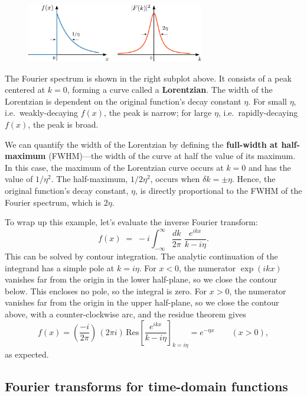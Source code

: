 \documentclass[10pt,a4paper]{article}
\begin{document}
\begin{figure}[h]
  \centering\includegraphics[width=0.69\textwidth]{fourier_example1}
\end{figure}

The Fourier spectrum is shown in the right subplot above. It consists
of a peak centered at $k = 0$, forming a curve called a
\textbf{Lorentzian}. The width of the Lorentzian is dependent on the
original function's decay constant $\eta$. For small $\eta$,
i.e.~weakly-decaying $f(x)$, the peak is narrow; for large $\eta$,
i.e.~rapidly-decaying $f(x)$, the peak is broad.

We can quantify the width of the Lorentzian by defining the
\textbf{full-width at half-maximum} (FWHM)---the width of the curve at
half the value of its maximum. In this case, the maximum of the
Lorentzian curve occurs at $k=0$ and has the value of $1/\eta^2$.  The
half-maximum, $1/2\eta^2$, occurs when $\delta k = \pm \eta$.  Hence,
the original function's decay constant, $\eta$, is directly
proportional to the FWHM of the Fourier spectrum, which is $2\eta$.

To wrap up this example, let's evaluate the inverse Fourier transform:
\begin{equation}
f(x) \; = \; -i\int_{-\infty}^\infty \frac{dk}{2\pi} \; \frac{e^{i kx}}{k-i\eta}.
\end{equation}
This can be solved by contour integration. The analytic continuation
of the integrand has a simple pole at $k = i\eta$. For $x < 0$, the
numerator $\exp(ikx)$ vanishes far from the origin in the lower
half-plane, so we close the contour below. This encloses no pole, so
the integral is zero. For $x > 0$, the numerator vanishes far from the
origin in the upper half-plane, so we close the contour above, with a
counter-clockwise arc, and the residue theorem gives
\begin{equation}
f(x) = \left(\frac{-i}{2\pi}\right) \, \left(2\pi i\right) \, \mathrm{Res}\left[ \frac{e^{ikx}}{k-i\eta}\right]_{k=i\eta} = e^{-\eta x} \qquad(x > 0),
\end{equation}
as expected.

\subsection{Fourier transforms for time-domain functions}
\label{fourier-time}
\end{document}
